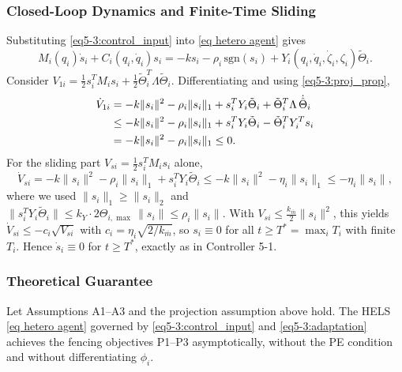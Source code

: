 \subsubsection{Closed-Loop Dynamics and Finite-Time Sliding}

Substituting \eqref{eq5-3:control_input} into \eqref{eq hetero agent} gives
\begin{equation}\label{eq5-3:s_dynamics}
	M_i(q_i)\dot{s}_i + C_i(q_i,\dot{q}_i)s_i
	= -k s_i - \rho_i\,\mathrm{sgn}(s_i)
	+ Y_i(q_i,\dot{q}_i,\dot{\zeta}_i,\zeta_i)\tilde{\Theta}_i.
\end{equation}
Consider $V_{1i} = \frac12 s_i^T M_i s_i + \frac12 \tilde{\Theta}_i^T \Lambda \tilde{\Theta}_i$.
Differentiating and using \eqref{eq5-3:proj_prop},
\begin{align}
	\dot{V}_{1i}
	&= -k\|s_i\|^2 - \rho_i\|s_i\|_1
		+ s_i^T Y_i\tilde{\Theta}_i
		+ \tilde{\Theta}_i^T \Lambda\,\dot{\hat{\Theta}}_i \notag\\
	&\le -k\|s_i\|^2 - \rho_i\|s_i\|_1
		+ s_i^T Y_i\tilde{\Theta}_i
		- \tilde{\Theta}_i^T Y_i^T s_i \notag\\
	&= -k\|s_i\|^2 - \rho_i\|s_i\|_1 \le 0. \label{eq5-3:V1_dot}
\end{align}
For the sliding part $V_{si} = \frac12 s_i^T M_i s_i$ alone,
\begin{equation}\label{eq5-3:Vs_dot}
	\dot{V}_{si} = -k\|s_i\|^2 - \rho_i\|s_i\|_1 + s_i^T Y_i\tilde{\Theta}_i
	\le -k\|s_i\|^2 - \eta_i\|s_i\|_1
	\le -\eta_i\|s_i\|,
\end{equation}
where we used $\|s_i\|_1 \ge \|s_i\|_2$ and
$\|s_i^T Y_i\tilde{\Theta}_i\| \le k_Y \cdot 2\Theta_{i,\max}\,\|s_i\| \le \rho_i\|s_i\|$.
With $V_{si} \le \tfrac{k_{\overline m}}{2}\|s_i\|^2$, this yields
$\dot{V}_{si} \le -c_i\sqrt{V_{si}}$ with $c_i = \eta_i\sqrt{2/k_{\overline m}}$, so
$s_i \equiv 0$ for all $t \ge T^* = \max_i T_i$ with finite $T_i$. Hence
$\dot{s}_i \equiv 0$ for $t \ge T^*$, exactly as in Controller 5-1.

\subsubsection{Theoretical Guarantee}

\begin{theorem}
	Let Assumptions A1--A3 and the projection assumption above hold. The HELS
	\eqref{eq hetero agent} governed by \eqref{eq5-3:control_input} and
	\eqref{eq5-3:adaptation} achieves the fencing objectives P1--P3 asymptotically,
	without the PE condition and without differentiating $\phi_i$.
\end{theorem}

